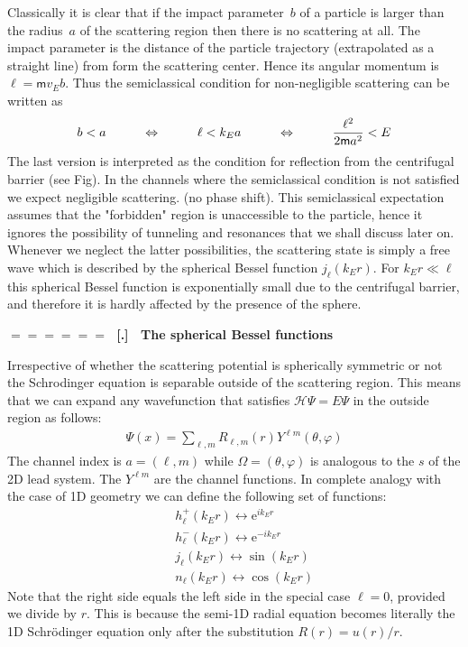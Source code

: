 \documentclass[onecolumn,fleqn]{revtex4}
\newcommand{\eexp}{\mathrm{e}^}
\newcommand{\mass}{\mathsf{m}}
\newcommand{\beq}{\begin{eqnarray}}
\newcommand{\eeq}{\end{eqnarray}}
\renewcommand{\thesubsection}{\arabic{subsection}}
\renewcommand{\thesubsubsection}{\arabic{subsubsection}}
\newcommand{\sheadC}[1]
{
\addtocounter{subsubsection}{1}
\vspace{5mm}
{\Large\bf $=\!=\!=\!=\!=\!=\;$ [\thesubsection.\thesubsubsection] \ #1}  
\nopagebreak
\phantomsection
}
\begin{document}
Classically it is clear that if the impact parameter~$b$
of a particle is larger than the radius~$a$ of the 
scattering region then there is no scattering at all.
The impact parameter is the distance of the particle 
trajectory (extrapolated as a straight line) from 
form the scattering center. Hence its angular momentum 
is $\ell=\mass v_E b$. Thus the semiclassical condition 
for  non-negligible scattering can be written as 
\beq
b<a 
\hspace*{1cm}\Leftrightarrow\hspace*{1cm}
\ell < k_Ea
\hspace*{1cm}\Leftrightarrow\hspace*{1cm} 
\frac{\ell^2}{2\mass a^2} < E
\eeq
The last version is interpreted as the condition 
for reflection from the centrifugal barrier (see Fig). 
In the channels where the semiclassical condition 
is not satisfied we expect negligible scattering. 
(no phase shift). This semiclassical expectation 
assumes that the "forbidden" region is unaccessible 
to the particle, hence it ignores the possibility 
of tunneling and resonances that we shall discuss later on.  
Whenever we neglect the latter possibilities, the scattering 
state is simply a free wave which is described by 
the spherical Bessel function $j_{\ell}(k_E r)$.  
For $k_E r \ll \ell$ this spherical Bessel function 
is exponentially small due to the centrifugal barrier,
and therefore it is hardly affected by the presence 
of the sphere.






\sheadC{The spherical Bessel functions}


Irrespective of whether the scattering 
potential is spherically symmetric 
or not the Schrodinger equation is 
separable outside of the scattering region.
This means that we can expand 
any wavefunction that satisfies 
${\mathcal{H}\Psi =E\Psi}$ 
in the outside region as follows:
\beq
\Psi(x)= \sum_{\ell,m} R_{\ell, m}(r) Y^{\ell m}(\theta,\varphi)
\eeq
The channel index is $a=(\ell,m)$ while $\Omega=(\theta,\varphi)$ 
is analogous to the $s$ of the 2D lead system. 
The  $Y^{\ell m}$ are the channel functions. 
In complete analogy with the case of 1D geometry 
we can define the following set of functions: 
\beq
&& h^{+}_{\ell}(k_Er)   \leftrightarrow \eexp{ik_Er} 
\\ \nonumber
&& h^{-}_{\ell}(k_Er) \leftrightarrow \eexp{-ik_Er} 
\\ \nonumber
&& j_{\ell}(k_Er) \leftrightarrow \sin(k_Er)   
\\ \nonumber
&& n_{\ell}(k_Er) \leftrightarrow \cos(k_Er)
\eeq
Note that the right side equals the 
left side in the special case $\ell=0$, 
provided we divide by $r$. This is because 
the semi-1D radial equation becomes literally 
the 1D Schr\"{o}dinger equation only after the 
substitution $R(r)=u(r)/r$.
\end{document}
